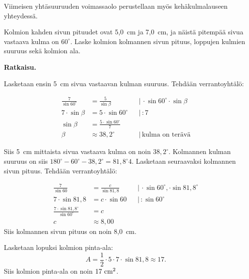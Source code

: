 Viimeisen yhtäsuuruuden voimassaolo perustellaan myös kehäkulmalauseen yhteydessä.


\begin{esimerkki}
Kolmion kahden sivun pituudet ovat 5,0~cm ja 7,0~cm, ja näistä pitempää sivua vastaava kulma on $60^\circ$. Laske kolmion kolmannen sivun pituus, loppujen kulmien suuruus sekä kolmion ala.



\textbf{Ratkaisu.}

Lasketaan ensin 5~cm sivua vastaavan kulman suuruus. Tehdään verrantoyhtälö:

\begin{align*}
\frac{7}{\sin 60^\circ}  &= \frac{5}{\sin \beta} & & | \, \cdot \sin 60^\circ \cdot \sin \beta\\
7 \cdot \sin \beta &= 5 \cdot \sin 60^\circ  & & | \,  :7\\
\sin \beta         &= \frac{5 \cdot \sin 60^\circ}{7}\\
\beta              &\approx 38,2^\circ & & | \, \text{kulma on terävä}
\end{align*}

Siis 5~cm mittaista sivua vastaava kulma on noin $38,2^\circ$. Kolmannen kulman suuruus on siis $180^\circ - 60^\circ -38,2^\circ = 81,8^\circ4$.
Lasketaan seuraavaksi kolmannen sivun pituus. Tehdään verrantoyhtälö:

\begin{align*}
\frac{7}{\sin 60}                 &= \frac{c}{\sin 81,8} & & | \,  \cdot \sin 60^\circ, \cdot \sin 81,8^\circ \\
7 \cdot \sin 81,8                 &= c \cdot \sin 60     & & | \,  : \sin 60^\circ \\
\frac{7 \cdot \sin 81,8^\circ}{\sin 60^\circ} &= c \\
c                                 &\approx 8,00
\end{align*}
Siis kolmannen sivun pituus on noin 8,0~cm.


Lasketaan lopuksi kolmion pinta-ala:
$$A = \frac{1}{2} \cdot 5 \cdot 7 \cdot \sin 81,8 \approx 17.$$
Siis kolmion pinta-ala on noin $17~\textnormal{cm}^2$.
\end{esimerkki}


